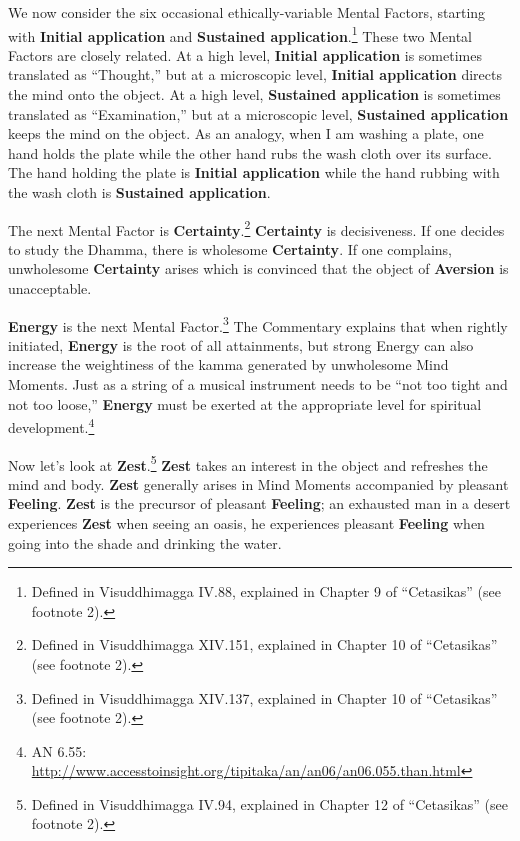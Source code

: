 We now consider the six occasional ethically-variable Mental Factors, starting with \textbf{Initial application} and \textbf{Sustained application}.\footnote{Defined in Visuddhimagga IV.88, explained in Chapter 9 of “Cetasikas” (see footnote 2).} These two Mental Factors are closely related. At a high level, \textbf{Initial application} is sometimes translated as “Thought,” but at a microscopic level, \textbf{Initial application} directs the mind onto the object. At a high level, \textbf{Sustained application} is sometimes translated as “Examination,” but at a microscopic level, \textbf{Sustained application} keeps the mind on the object. As an analogy, when I am washing a plate, one hand holds the plate while the other hand rubs the wash cloth over its surface. The hand holding the plate is \textbf{Initial application} while the hand rubbing with the wash cloth is \textbf{Sustained application}.

The next Mental Factor is \textbf{Certainty}.\footnote{Defined in Visuddhimagga XIV.151, explained in Chapter 10 of “Cetasikas” (see footnote 2).} \textbf{Certainty} is decisiveness. If one decides to study the Dhamma, there is wholesome \textbf{Certainty}. If one complains, unwholesome \textbf{Certainty} arises which is convinced that the object of \textbf{Aversion} is unacceptable.

\textbf{Energy} is the next Mental Factor.\footnote{Defined in Visuddhimagga XIV.137, explained in Chapter 10 of “Cetasikas” (see footnote 2).} The Commentary explains that when rightly initiated, \textbf{Energy} is the root of all attainments, but strong Energy can also increase the weightiness of the kamma generated by unwholesome Mind Moments. Just as a string of a musical instrument needs to be “not too tight and not too loose,” \textbf{Energy} must be exerted at the appropriate level for spiritual development.\footnote{AN 6.55: \url{http://www.accesstoinsight.org/tipitaka/an/an06/an06.055.than.html}}

Now let’s look at \textbf{Zest}.\footnote{Defined in Visuddhimagga IV.94, explained in Chapter 12 of “Cetasikas” (see footnote 2).} \textbf{Zest} takes an interest in the object and refreshes the mind and body. \textbf{Zest} generally arises in Mind Moments accompanied by pleasant \textbf{Feeling}. \textbf{Zest} is the precursor of pleasant \textbf{Feeling}; an exhausted man in a desert experiences \textbf{Zest} when seeing an oasis, he experiences pleasant \textbf{Feeling} when going into the shade and drinking the water.

